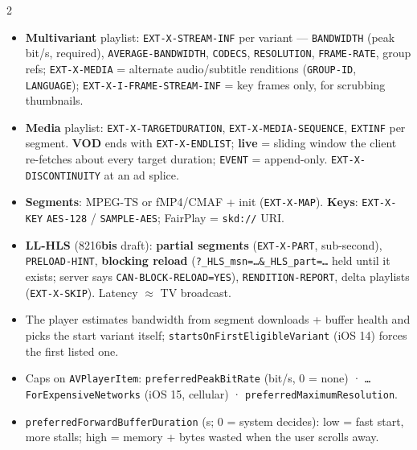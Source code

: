 \documentclass[8pt]{extarticle}
\newcommand\ct[1]{\texttt{#1}}
\newcommand\hd[1]{\par\vspace{3pt}\noindent{\bfseries\color{sheetBlue}#1}\par\vspace{1pt}}
\begin{document}
\begin{multicols}{2}
\raggedright\small{}

\hd{HLS (RFC 8216)}
\begin{itemize}
  \item \textbf{Multivariant} playlist: \ct{EXT-X-STREAM-INF} per variant — \ct{BANDWIDTH} (peak
        bit/s, required), \ct{AVERAGE-BANDWIDTH}, \ct{CODECS}, \ct{RESOLUTION}, \ct{FRAME-RATE}, group
        refs; \ct{EXT-X-MEDIA} = alternate audio/subtitle renditions (\ct{GROUP-ID}, \ct{LANGUAGE});
        \ct{EXT-X-I-FRAME-STREAM-INF} = key frames only, for scrubbing thumbnails.
  \item \textbf{Media} playlist: \ct{EXT-X-TARGETDURATION}, \ct{EXT-X-MEDIA-SEQUENCE}, \ct{EXTINF}
        per segment. \textbf{VOD} ends with \ct{EXT-X-ENDLIST}; \textbf{live} = sliding window the
        client re-fetches about every target duration; \ct{EVENT} = append-only.
        \ct{EXT-X-DISCONTINUITY} at an ad splice.
  \item \textbf{Segments}: MPEG-TS or fMP4/CMAF + init (\ct{EXT-X-MAP}). \textbf{Keys}:
        \ct{EXT-X-KEY} \ct{AES-128} / \ct{SAMPLE-AES}; FairPlay = \ct{skd://} URI.
  \item \textbf{LL-HLS} (8216\textbf{bis} draft): \textbf{partial segments} (\ct{EXT-X-PART}, sub-second), \ct{PRELOAD-HINT},
        \textbf{blocking reload} (\ct{?\_HLS\_msn=…\&\_HLS\_part=…} held until it exists; server says
        \ct{CAN-BLOCK-RELOAD=YES}), \ct{RENDITION-REPORT}, delta playlists (\ct{EXT-X-SKIP}).
        Latency $\approx$ TV broadcast.
\end{itemize}

\hd{ABR — what you control}
\begin{itemize}
  \item The player estimates bandwidth from segment downloads + buffer health and picks the start
        variant itself; \ct{startsOnFirstEligibleVariant} (iOS 14) forces the first listed one.
  \item Caps on \ct{AVPlayerItem}: \ct{preferredPeakBitRate} (bit/s, 0 = none) ·
        \ct{…ForExpensiveNetworks} (iOS 15, cellular) · \ct{preferredMaximumResolution}.
  \item \ct{preferredForwardBufferDuration} (s; 0 = system decides): low = fast start, more
        stalls; high = memory + bytes wasted when the user scrolls away.
\end{itemize}


\end{multicols}
\end{document}
